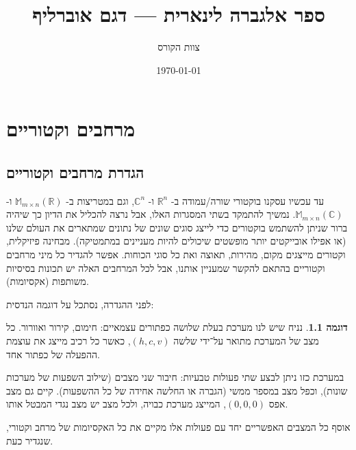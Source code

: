 \documentclass[12pt]{report}
\title{ספר אלגברה לינארית — דגם אוברליף}
\author{צוות הקורס}
\date{\today}
\theoremstyle{plain}
\theoremstyle{definition}
\newtheorem{example}{דוגמה}[chapter]
\newcommand{\R}{\mathbb{R}}
\newcommand{\C}{\mathbb{C}}
\newcommand{\M}{\mathbb{M}}
\newcommand{\0}{\mathbf{0}}
\begin{document}
\maketitle

\chapter{מרחבים וקטוריים}\label{ch:vectorspaces}

\section{הגדרת מרחבים וקטוריים}
עד עכשיו עסקנו בוקטורי שורה/עמודה ב-
$\R^n$
ו-
$\C^n$,
וגם במטריצות ב-
$\M_{m\times n}(\R)$
ו-
$\M_{m\times n}(\C)$.
נמשיך להתמקד בשתי המסגרות האלו, אבל נרצה להכליל את הדיון כך שיהיה ברור שניתן להשתמש בוקטורים כדי לייצג סוגים שונים של נתונים שמתארים את העולם שלנו (או אפילו אובייקטים יותר מופשטים שיכולים להיות מעניינים במתמטיקה). מבחינה פיזיקלית, וקטורים מייצגים מקום, מהירות, תאוצה ואת כל סוגי הכוחות. אפשר להגדיר כל מיני מרחבים וקטוריים בהתאם להקשר שמעניין אותנו, אבל לכל המרחבים האלה יש תכונות בסיסיות משותפות (אקסיומות).

לפני ההגדרה, נסתכל על דוגמה הנדסית:

\begin{example}
נניח שיש לנו מערכת בעלת שלושה כפתורים עצמאיים: חימום, קירור ואוורור.
כל מצב של המערכת מתואר על־ידי שלשה $(h,c,v)$, כאשר כל רכיב מייצג את עוצמת ההפעלה
של כפתור אחד.

במערכת כזו ניתן לבצע שתי פעולות טבעיות:
חיבור שני מצבים (שילוב השפעות של מערכות שונות),
וכפל מצב במספר ממשי (הגברה או החלשה אחידה של כל ההשפעות).
קיים גם מצב אפס $(0,0,0)$, המייצג מערכת כבויה,
ולכל מצב יש מצב נגדי המבטל אותו.

אוסף כל המצבים האפשריים יחד עם פעולות אלו מקיים את כל האקסיומות של מרחב וקטורי, שנגדיר כעת.
\end{example}
\end{document}
